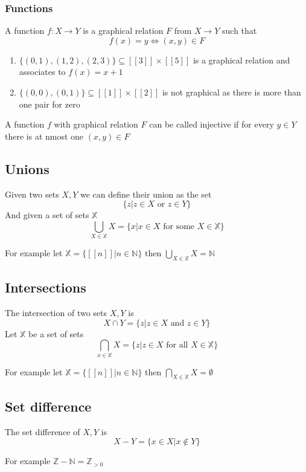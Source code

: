 \documentclass{article}
\begin{document}
\subsubsection{Functions}
\begin{definition}
    A function $f:X \to Y$ is a graphical relation $F$ from $X \to Y$ such that
    \[f(x) = y \Leftrightarrow (x,y) \in F\]
\end{definition}
\begin{example}
    \begin{enumerate}
        \item $\{(0,1),(1,2),(2,3)\} \subseteq [[3]] \times [[5]]$ is a graphical relation and associates to $f(x) = x+1$
        \item $\{(0,0),(0,1)\} \subseteq [[1]] \times [[2]]$ is not graphical as there is more than one pair for zero
    \end{enumerate}
\end{example}
\begin{definition}
    A function $f$ with graphical relation $F$ can be called injective if for every $y \in Y$ there is at nmost one $(x,y) \in F$
\end{definition}
\subsection{Unions}
\begin{definition}
    Given two sets $X,Y$ we can define their union as the set
    \[\{z|z \in X \text{ or } z \in Y\}\]
    And given a set of sets $\mathbb{X}$
    \[\bigcup_{X \in \mathbb{X}} X = \{x|x \in X \text{ for some }X \in \mathbb{X} \}\]
\end{definition}
For example let $\mathbb{X} = \{[[n]]|n \in \mathbb{N}\}$ then $\bigcup_{X \in \mathbb{X}} X = \mathbb{N}$ 
\subsection{Intersections}
\begin{definition}
    The intersection of two sets $X,Y$ is 
    \[X \cap Y = \{z|z \in X \text{ and }z \in Y \}\]
    Let $\mathbb{X}$ be a set of sets 
    \[\bigcap_{x \in \mathbb{X}}X = \{z|z \in X \text{ for all } X \in \mathbb{X}\}\]
\end{definition}
For example let $\mathbb{X} = \{[[n]] | n \in \mathbb{N}\}$ then $\bigcap_{X \in \mathbb{X}}X = \emptyset$
\subsection{Set difference}
\begin{definition}
    The set difference of $X,Y$ is
    \[X - Y = \{x \in X| x \notin Y\}\]    
\end{definition}
For example $\mathbb{Z} - \mathbb{N} = \mathbb{Z}_{>0}$
\end{document}
